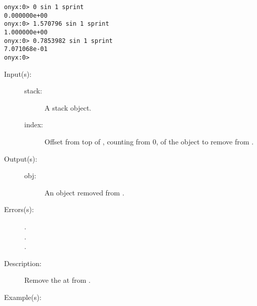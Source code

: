 \begin{description}
\begin{description}
\begin{verbatim}
onyx:0> 0 sin 1 sprint
0.000000e+00
onyx:0> 1.570796 sin 1 sprint
1.000000e+00
onyx:0> 0.7853982 sin 1 sprint
7.071068e-01
onyx:0>
		\end{verbatim}
	\end{description}
\label{systemdict:sipop}
\item[{\onyxop{stack index}{sipop}{obj}}: ]
	\begin{description}\item[]
	\item[Input(s): ]
		\begin{description}\item[]
		\item[stack: ]
			A stack object.
		\item[index: ]
			Offset from top of , counting from 0, of
			the object to remove from .
		\end{description}
	\item[Output(s): ]
		\begin{description}\item[]
		\item[obj: ]
			An object removed from .
		\end{description}
	\item[Errors(s): ]
		\begin{description}\item[]
		\item[.]
		\item[.]
		\item[.]
		\end{description}
	\item[Description: ]
		Remove the  at  from .
	\item[Example(s): ]\begin{verbatim}


\end{verbatim}
\end{description}
\end{description}
